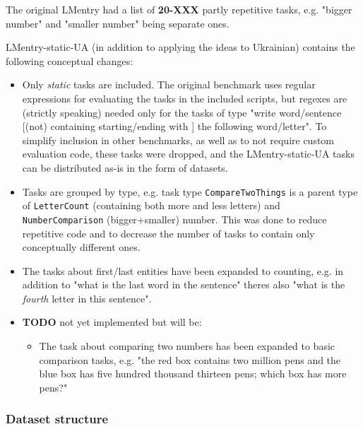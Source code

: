 The original LMentry \cite{bm_lmentry} had a list of \textbf{20-XXX}
partly repetitive tasks, e.g. "bigger number" and "smaller number" being
separate ones.

LMentry-static-UA (in addition to applying the ideas to Ukrainian)
contains the following conceptual changes:

\begin{itemize}
\tightlist
\item
  Only \emph{static} tasks are included. The original benchmark uses
  regular expressions for evaluating the tasks in the included scripts,
  but regexes are (strictly speaking) needed only for the tasks of type
  "write word/sentence {[}(not) containing \textbar{} starting/ending
  with {]} the following word/letter". To simplify inclusion in other
  benchmarks, as well as to not require custom evaluation code, these
  tasks were dropped, and the LMentry-static-UA tasks can be distributed
  as-is in the form of datasets.
\item
  Tasks are grouped by type, e.g. task type \texttt{CompareTwoThings} is
  a parent type of \texttt{LetterCount} (containing both
  \textquotesingle more\textquotesingle{} and
  \textquotesingle less\textquotesingle{} letters) and
  \texttt{NumberComparison} (bigger+smaller) number. This was done to
  reduce repetitive code and to decrease the number of tasks to contain
  only conceptually different ones.
\item
  The tasks about first/last entities have been expanded to counting,
  e.g. in addition to "what is the last word in the sentence"
  there\textquotesingle s also "what is the \emph{fourth} letter in this
  sentence".
\item
  \textbf{TODO} not yet implemented but will be:

  \begin{itemize}
  \tightlist
  \item
    The task about comparing two numbers has been expanded to basic
    comparison tasks, e.g. "the red box contains two million pens and
    the blue box has five hundred thousand thirteen pens; which box has
    more pens?"
  \end{itemize}
\end{itemize}

\subsubsection{Dataset structure}\label{dataset-structure}

